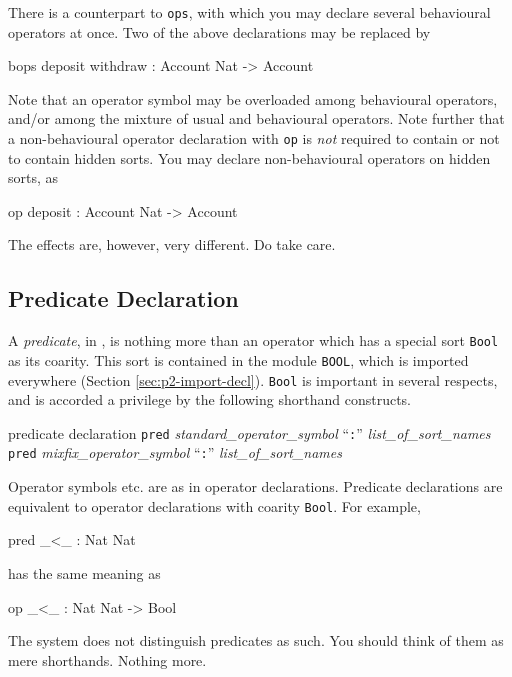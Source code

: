 \documentclass[a4paper]{memoir}
\begin{document}
There is a counterpart to \verb|ops|, with which you may
declare several behavioural operators at once.
Two of the above declarations may be
replaced by
\begin{vvtm}
\begin{ccode}
  bops deposit withdraw : Account Nat -> Account
\end{ccode}
\end{vvtm}
Note that an operator symbol may be overloaded among behavioural operators,
and/or among the mixture of usual and behavioural operators. Note
further that a non-behavioural operator declaration with
\verb|op| is {\em not} required to contain or not to contain
hidden sorts. You may declare non-behavioural operators on hidden sorts, as
\begin{vvtm}
\begin{ccode}
  op deposit : Account Nat -> Account
\end{ccode}
\end{vvtm}
The effects are, however, very different. Do take care.

\subsection{Predicate Declaration}\label{sec:p2-pred-decl}

A {\em predicate}, in \cafeobj, is nothing more
than an operator which has a special sort \verb|Bool| as its coarity.
This sort is contained in the module \verb|BOOL|, which is imported
everywhere (Section \ref{sec:p2-import-decl}).
\verb|Bool| is important in several respects, and is accorded a privilege
by the following shorthand constructs.

\begin{bsyntax} predicate declaration  \Hline
\texttt{pred} \textit{standard\_operator\_symbol} ``\texttt{:}'' \textit{list\_of\_sort\_names}
\texttt{pred} \textit{mixfix\_operator\_symbol} ``\texttt{:}'' \textit{list\_of\_sort\_names}
\end{bsyntax}

Operator symbols etc. are as in operator declarations. Predicate
declarations are equivalent to operator declarations with
coarity \verb|Bool|. For example,
\begin{vvtm}
\begin{ccode}
  pred _<_ : Nat Nat
\end{ccode}
\end{vvtm}
has the same meaning as
\begin{vvtm}
\begin{ccode}
  op _<_ : Nat Nat -> Bool
\end{ccode}
\end{vvtm}
\begin{warning}
  The system does not distinguish predicates as such.
  You should think of them as mere shorthands. Nothing more.
\end{warning}
\end{document}
